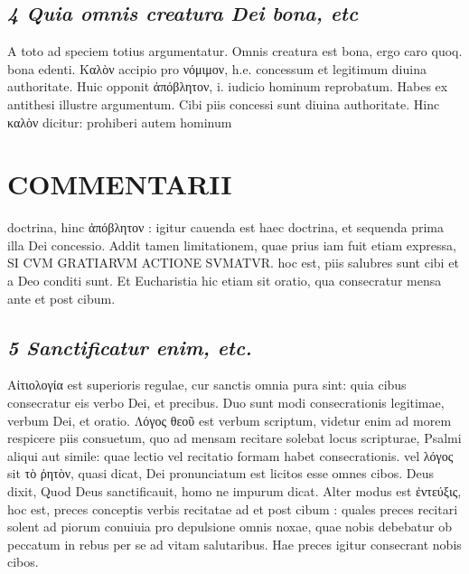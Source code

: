 \documentclass{article}
\begin{document}
\begin{pages}
\subsection*{\textit{4 Quia omnis creatura Dei bona, etc }}\pstart A toto ad speciem totius argumentatur. Omnis creatura est bona, ergo caro quoq. bona edenti. Καλὸν accipio pro νόμιμον, h.e. concessum et legitimum diuina authoritate. Huic opponit ἀπόβλητον, i. iudicio hominum reprobatum. Habes ex antithesi illustre argumentum. Cibi piis concessi sunt diuina authoritate. Hinc καλὸν dicitur: prohiberi autem hominum  \pend
\section*{COMMENTARII }
\marginpar{[ p.92 ]}\pstart doctrina, hinc ἀπόβλητον : igitur cauenda est haec doctrina, et sequenda prima illa Dei concessio. Addit tamen limitationem, quae prius iam fuit etiam expressa, SI CVM GRATIARVM ACTIONE SVMATVR. hoc est, piis salubres sunt cibi et a Deo conditi sunt. Et Eucharistia hic etiam sit oratio, qua consecratur mensa ante et post cibum.  \pend
{}
{}
\subsection*{\textit{5 Sanctificatur enim, etc. }}\pstart Αἰτιολογία est superioris regulae, cur sanctis omnia pura sint: quia cibus consecratur eis verbo Dei, et precibus. Duo sunt modi consecrationis legitimae, verbum Dei, et oratio. Λόγος θεοῦ est verbum scriptum, videtur enim ad morem respicere piis consuetum, quo ad mensam recitare solebat locus scripturae, Psalmi aliqui aut simile: quae lectio vel recitatio formam habet consecrationis. vel λόγος sit τὸ ῤητὸν, quasi dicat, Dei pronunciatum est licitos esse omnes cibos. Deus dixit, Quod Deus sanctificauit, homo ne impurum dicat. Alter modus est ἐντεύξις, hoc est, preces conceptis verbis recitatae ad et post cibum : quales preces recitari solent ad piorum conuiuia pro depulsione omnis noxae, quae nobis debebatur ob peccatum in rebus per se ad vitam salutaribus. Hae preces igitur consecrant nobis cibos.  \pend

\end{pages}
\end{document}
